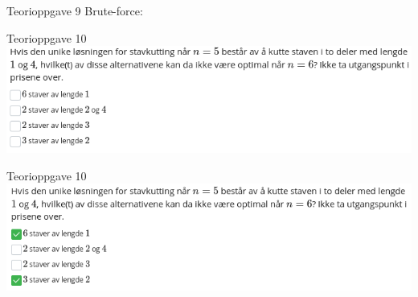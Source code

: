 \documentclass[14pt]{beamer}
\begin{document}
\begin{frame}[fragile]{Teorioppgave 9}
    Brute-force:

\end{frame}
\begin{frame}[fragile]{Teorioppgave 10}
    \includegraphics[width=\textwidth]{images/06t_q10.png}
\end{frame}
\begin{frame}[fragile]{Teorioppgave 10}
    \includegraphics[width=\textwidth]{images/06t_q10_sol.png}
\end{frame}
\end{document}
